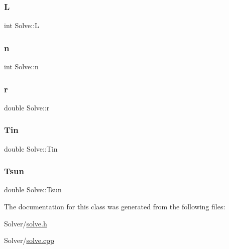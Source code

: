 \subsubsection{\texorpdfstring{L}{L}}
{\footnotesize\ttfamily int Solve\+::L}

\mbox{\label{class_solve_acc2a34441a699bf1e68f730a1bbe7774}} 
\subsubsection{\texorpdfstring{n}{n}}
{\footnotesize\ttfamily int Solve\+::n}

\mbox{\label{class_solve_a8007aa7266c3ba3207ce233d54d720d7}} 
\subsubsection{\texorpdfstring{r}{r}}
{\footnotesize\ttfamily double Solve\+::r}

\mbox{\label{class_solve_a324c747af91a26a206d7772853b8655e}} 
\subsubsection{\texorpdfstring{Tin}{Tin}}
{\footnotesize\ttfamily double Solve\+::\+Tin}

\mbox{\label{class_solve_a7145536b49fb1ac4d2f36f800d118616}} 
\subsubsection{\texorpdfstring{Tsun}{Tsun}}
{\footnotesize\ttfamily double Solve\+::\+Tsun}



The documentation for this class was generated from the following files\+:\begin{DoxyCompactItemize}
\item 
Solver/\hyperlink{solve_8h}{solve.\+h}\item 
Solver/\hyperlink{solve_8cpp}{solve.\+cpp}\end{DoxyCompactItemize}
